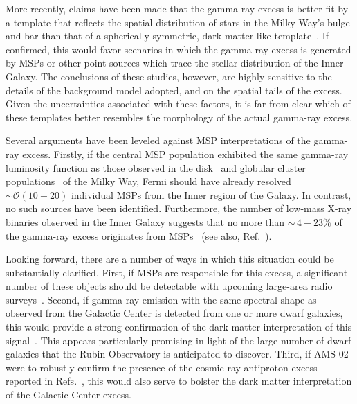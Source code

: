 \documentclass[aps,prd,twocolumn,amsmath,superscriptaddress,amssymb,showpacs,floatfix,nofootinbib,longbibliography,preprintnumbers]{revtex4-1}
\begin{document}
More recently, claims have been made that the gamma-ray excess is better fit by a template that reflects the spatial distribution of stars in the Milky Way's bulge and bar than that of a spherically symmetric, dark matter-like template~\cite{Macias:2016nev,Bartels:2017vsx,Macias:2019omb}. If confirmed, this would favor scenarios in which the gamma-ray excess is generated by MSPs or other point sources which trace the stellar distribution of the Inner Galaxy. The conclusions of these studies, however, are highly sensitive to the details of the background model adopted, and on the spatial tails of the excess. Given the uncertainties associated with these factors, it is far from clear which of these templates better resembles the morphology of the actual gamma-ray excess. 

Several arguments have been leveled against MSP interpretations of the gamma-ray excess. Firstly, if the central MSP population exhibited the same gamma-ray luminosity function as those observed in the disk~\cite{Cholis:2014lta,Hooper:2015jlu,Bartels:2017xba} and globular cluster populations~\cite{Hooper:2016rap} of the Milky Way, Fermi should have already resolved $\sim \mathcal{O}(10-20)$ individual MSPs from the Inner region of the Galaxy. In contrast, no such sources have been identified. Furthermore, the number of low-mass X-ray binaries observed in the Inner Galaxy suggests that no more than $\sim$\,$4-23\%$ of the gamma-ray excess originates from MSPs~\cite{Haggard:2017lyq} (see also, Ref.~\cite{Cholis:2014lta}).

Looking forward, there are a number of ways in which this situation could be substantially clarified. First, if MSPs are responsible for this excess, a significant number of these objects should be detectable with upcoming large-area radio surveys~\cite{Calore:2015bsx}. Second, if gamma-ray emission with the same spectral shape as observed from the Galactic Center is detected from one or more dwarf galaxies, this would provide a strong confirmation of the dark matter interpretation of this signal~\cite{Fermi-LAT:2016uux}. This appears particularly promising in light of the large number of dwarf galaxies that the Rubin Observatory is anticipated to discover. Third, if AMS-02 were to robustly confirm the presence of the cosmic-ray antiproton excess reported in Refs.~\cite{Cuoco:2016eej,Cui:2016ppb,Cholis:2019ejx,Cuoco:2019kuu}, this would also serve to bolster the dark matter interpretation of the Galactic Center excess.
\end{document}
